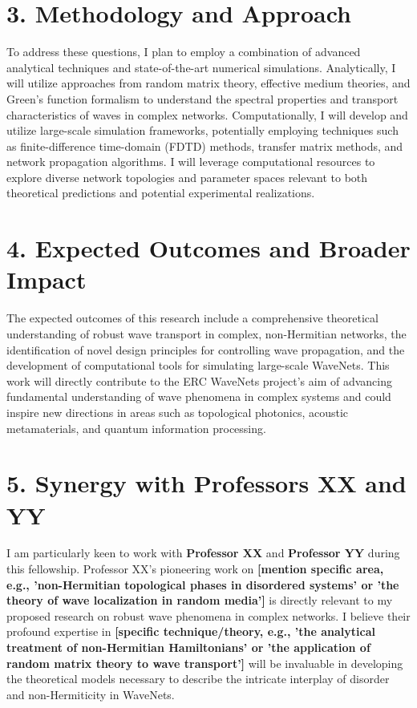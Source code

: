 \documentclass[a4paper, 11pt]{article}
\begin{document}
\section*{3. Methodology and Approach}
To address these questions, I plan to employ a combination of advanced analytical techniques and state-of-the-art numerical simulations. Analytically, I will utilize approaches from random matrix theory, effective medium theories, and Green's function formalism to understand the spectral properties and transport characteristics of waves in complex networks. Computationally, I will develop and utilize large-scale simulation frameworks, potentially employing techniques such as finite-difference time-domain (FDTD) methods, transfer matrix methods, and network propagation algorithms. I will leverage computational resources to explore diverse network topologies and parameter spaces relevant to both theoretical predictions and potential experimental realizations.

\section*{4. Expected Outcomes and Broader Impact}
The expected outcomes of this research include a comprehensive theoretical understanding of robust wave transport in complex, non-Hermitian networks, the identification of novel design principles for controlling wave propagation, and the development of computational tools for simulating large-scale WaveNets. This work will directly contribute to the ERC WaveNets project's aim of advancing fundamental understanding of wave phenomena in complex systems and could inspire new directions in areas such as topological photonics, acoustic metamaterials, and quantum information processing.

\section*{5. Synergy with Professors XX and YY}
I am particularly keen to work with \textbf{Professor XX} and \textbf{Professor YY} during this fellowship. Professor XX's pioneering work on \textbf{[mention specific area, e.g., 'non-Hermitian topological phases in disordered systems' or 'the theory of wave localization in random media']} is directly relevant to my proposed research on robust wave phenomena in complex networks. I believe their profound expertise in \textbf{[specific technique/theory, e.g., 'the analytical treatment of non-Hermitian Hamiltonians' or 'the application of random matrix theory to wave transport']} will be invaluable in developing the theoretical models necessary to describe the intricate interplay of disorder and non-Hermiticity in WaveNets.
\end{document}
